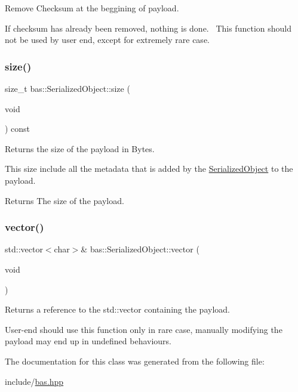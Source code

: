 Remove Checksum at the beggining of payload. 

If checksum has already been removed, nothing is done.~\newline
This function should not be used by user end, except for extremely rare case. \mbox{\label{classbas_1_1SerializedObject_a827e920a13f1294b165c2b54e73277f9}} 
\subsubsection{\texorpdfstring{size()}{size()}}
{\footnotesize\ttfamily size\+\_\+t bas\+::\+Serialized\+Object\+::size (\begin{DoxyParamCaption}\item[{void}]{ }\end{DoxyParamCaption}) const\hspace{0.3cm}{\ttfamily [inline]}}



Returns the size of the payload in Bytes. 

This size include all the metadata that is added by the \mbox{\hyperlink{classbas_1_1SerializedObject}{Serialized\+Object}} to the payload. \begin{DoxyReturn}{Returns}
The size of the payload. 
\end{DoxyReturn}
\mbox{\label{classbas_1_1SerializedObject_aa2e206649520759e7d6493b0122a9988}} 
\subsubsection{\texorpdfstring{vector()}{vector()}}
{\footnotesize\ttfamily std\+::vector$<$char$>$\& bas\+::\+Serialized\+Object\+::vector (\begin{DoxyParamCaption}\item[{void}]{ }\end{DoxyParamCaption})\hspace{0.3cm}{\ttfamily [inline]}}



Returns a reference to the std\+::vector containing the payload. 

User-\/end should use this function only in rare case, manually modifying the payload may end up in undefined behaviours. 

The documentation for this class was generated from the following file\+:\begin{DoxyCompactItemize}
\item 
include/\mbox{\hyperlink{bas_8hpp}{bas.\+hpp}}\end{DoxyCompactItemize}
